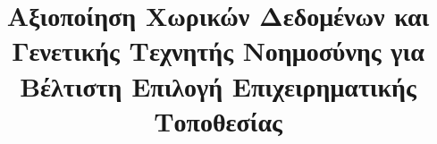 \documentclass{uthece-thesis}
\title{Αξιοποίηση Χωρικών Δεδομένων και Γενετικής Τεχνητής Νοημοσύνης για Βέλτιστη Επιλογή Επιχειρηματικής Τοποθεσίας}
\begin{document}
\frontmatter
\maketitle


	\listoffigures %
	\listoftables %
%


\mainmatter
    
    
    
    
    
    
%


	



    

\ifgrthesisoption
    \renewcommand{\chaptername}{Παράρτημα}
\else
    \renewcommand{\chaptername}{Appendix}
\fi

    
    \renewcommand{\thechapter}{A}
    

    \renewcommand{\thechapter}{B}
    

    \renewcommand{\thechapter}{C}
    



  \renewcommand{\thechapter}{} 
  \renewcommand{\thesection}{\arabic{section}}
%
%   

%
\end{document}
